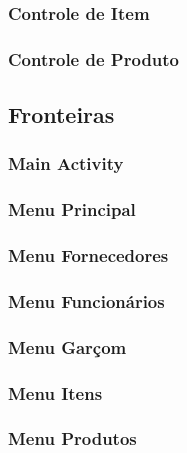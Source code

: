 \subsubsection{Controle de Item}

\subsubsection{Controle de Produto}


\subsection{Fronteiras}

\subsubsection{Main Activity}

\subsubsection{Menu Principal}

\subsubsection{Menu Fornecedores}

\subsubsection{Menu Funcionários}

\subsubsection{Menu Garçom}

\subsubsection{Menu Itens}

\subsubsection{Menu Produtos}

